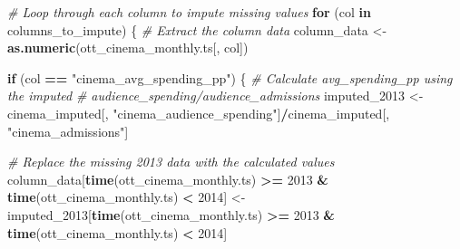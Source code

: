 \documentclass[
]{article}
\newenvironment{Shaded}{\begin{snugshade}}{\end{snugshade}}
\newcommand{\CommentTok}[1]{\textcolor[rgb]{0.56,0.35,0.01}{\textit{#1}}}
\newcommand{\ControlFlowTok}[1]{\textcolor[rgb]{0.13,0.29,0.53}{\textbf{#1}}}
\newcommand{\DecValTok}[1]{\textcolor[rgb]{0.00,0.00,0.81}{#1}}
\newcommand{\FunctionTok}[1]{\textcolor[rgb]{0.13,0.29,0.53}{\textbf{#1}}}
\newcommand{\NormalTok}[1]{#1}
\newcommand{\OtherTok}[1]{\textcolor[rgb]{0.56,0.35,0.01}{#1}}
\newcommand{\SpecialCharTok}[1]{\textcolor[rgb]{0.81,0.36,0.00}{\textbf{#1}}}
\newcommand{\StringTok}[1]{\textcolor[rgb]{0.31,0.60,0.02}{#1}}
\begin{document}
\begin{Shaded}
\begin{Highlighting}[]
\CommentTok{\# Loop through each column to impute missing values}
\ControlFlowTok{for}\NormalTok{ (col }\ControlFlowTok{in}\NormalTok{ columns\_to\_impute) \{}
    \CommentTok{\# Extract the column data}
\NormalTok{    column\_data }\OtherTok{\textless{}{-}} \FunctionTok{as.numeric}\NormalTok{(ott\_cinema\_monthly.ts[, col])}

    \ControlFlowTok{if}\NormalTok{ (col }\SpecialCharTok{==} \StringTok{"cinema\_avg\_spending\_pp"}\NormalTok{) \{}
        \CommentTok{\# Calculate avg\_spending\_pp using the imputed}
        \CommentTok{\# audience\_spending/audience\_admissions}
\NormalTok{        imputed\_2013 }\OtherTok{\textless{}{-}}\NormalTok{ cinema\_imputed[, }\StringTok{"cinema\_audience\_spending"}\NormalTok{]}\SpecialCharTok{/}\NormalTok{cinema\_imputed[,}
            \StringTok{"cinema\_admissions"}\NormalTok{]}

        \CommentTok{\# Replace the missing 2013 data with the calculated values}
\NormalTok{        column\_data[}\FunctionTok{time}\NormalTok{(ott\_cinema\_monthly.ts) }\SpecialCharTok{\textgreater{}=} \DecValTok{2013} \SpecialCharTok{\&} \FunctionTok{time}\NormalTok{(ott\_cinema\_monthly.ts) }\SpecialCharTok{\textless{}}
            \DecValTok{2014}\NormalTok{] }\OtherTok{\textless{}{-}}\NormalTok{ imputed\_2013[}\FunctionTok{time}\NormalTok{(ott\_cinema\_monthly.ts) }\SpecialCharTok{\textgreater{}=} \DecValTok{2013} \SpecialCharTok{\&} \FunctionTok{time}\NormalTok{(ott\_cinema\_monthly.ts) }\SpecialCharTok{\textless{}}
            \DecValTok{2014}\NormalTok{]}


\end{Highlighting}
\end{Shaded}
\end{document}
